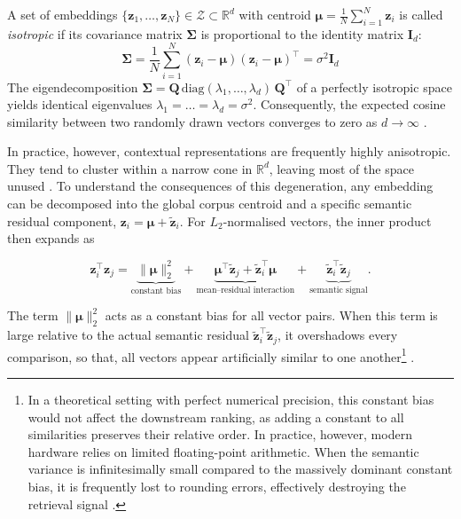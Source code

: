 \begin{definition}[Isotropy]
\label{def:isotropy}
A set of embeddings $\{\mathbf{z}_1, \dots, \mathbf{z}_N\} \in \mathcal{Z} \subset \mathbb{R}^d$ with centroid $\boldsymbol{\mu} = \frac{1}{N}\sum_{i=1}^N \mathbf{z}_i$ is called \emph{isotropic} if its covariance matrix $\boldsymbol{\Sigma}$ is proportional to the identity matrix $\mathbf{I}_d$:
\begin{equation}
    \boldsymbol{\Sigma} 
    = \frac{1}{N}\sum_{i=1}^{N} (\mathbf{z}_i - \boldsymbol{\mu}) (\mathbf{z}_i - \boldsymbol{\mu})^\top 
    = \sigma^2 \mathbf{I}_d
    \label{eq:cov_matrix}
\end{equation}
The eigendecomposition $\boldsymbol{\Sigma} = \mathbf{Q}\,\mathrm{diag}(\lambda_1, \dots, \lambda_d)\,\mathbf{Q}^\top$ of a perfectly isotropic space yields identical eigenvalues $\lambda_1 = \dots = \lambda_d = \sigma^2$. 
Consequently, the expected cosine similarity between two randomly drawn vectors converges to zero as $d \to \infty$ \cite[]{rudman-etal-2022-isoscore, Cai2021IsotropyIT}.
\end{definition}

In practice, however, contextual representations are frequently highly anisotropic. They tend to cluster within a narrow cone in $\mathbb{R}^d$, leaving most of the space unused \cite{ethayarajh-2019-contextual, GaoHTQWL19}.  To understand the consequences of this degeneration, any embedding can be decomposed into the global corpus centroid and a specific semantic residual component, $\mathbf{z}_i = \boldsymbol{\mu} + \tilde{\mathbf{z}}_i$. For $L_2$-normalised vectors, the inner product then expands as

\begin{equation}
    \mathbf{z}_i^\top \mathbf{z}_j 
    = \underbrace{\|\boldsymbol{\mu}\|_2^2}_{\text{constant bias}}
    + \underbrace{\boldsymbol{\mu}^\top \tilde{\mathbf{z}}_j 
    + \tilde{\mathbf{z}}_i^\top \boldsymbol{\mu}}_{\text{mean--residual interaction}}
    + \underbrace{\tilde{\mathbf{z}}_i^\top \tilde{\mathbf{z}}_j}_{\text{semantic signal}} .
    \label{eq:mean_shift}
\end{equation}

The term $\|\boldsymbol{\mu}\|_2^2$ acts as a constant bias for all vector pairs. When this term is large relative to the actual semantic residual $\tilde{\mathbf{z}}_i^\top \tilde{\mathbf{z}}_j$, it overshadows every comparison, so that, all vectors appear artificially similar to one another\footnote{In a theoretical setting with perfect numerical precision, this constant bias would not affect the downstream ranking, as adding a constant to all similarities preserves their relative order. In practice, however, modern hardware relies on limited floating-point arithmetic. When the semantic variance is infinitesimally small compared to the massively dominant constant bias, it is frequently lost to rounding errors, effectively destroying the retrieval signal \cite{GaoHTQWL19}.} \cite{ethayarajh-2019-contextual,mu2018allbutthetop}. 

